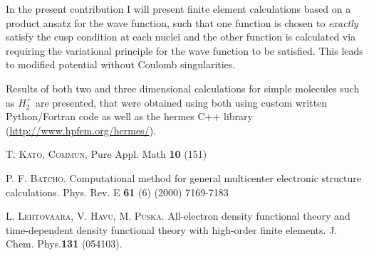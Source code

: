 In the present contribution I will present finite element calculations based on a product ansatz for the wave function, such that one function is chosen to {\it exactly} satisfy the cusp condition at each nuclei and the other function is calculated via requiring the variational principle for the wave function  to be satisfied. This leads to modified potential without Coulomb singularities.

Results of both two and three dimensional calculations for simple molecules  such as  $H_2^+$ are presented, that were obtained using both using custom written Python/Fortran code as well as the hermes C++ library (\url{http://www.hpfem.org/hermes/}).


\begin{thebibliography}{10}
\textsc{T. Kato, Commun}. {Pure Appl. Math {\bf 10} (151)}

\textsc{P. F. Batcho}. {Computational method for general multicenter electronic structure calculations}. Phys. Rev. E {\bf 61} (6) (2000) 7169-7183

\textsc{L. Lehtovaara, V. Havu, M. Puska}. {All-electron density functional theory and time-dependent density functional theory with high-order ﬁnite elements}. J. Chem. Phys.{\bf 131} (054103).
\end{thebibliography}